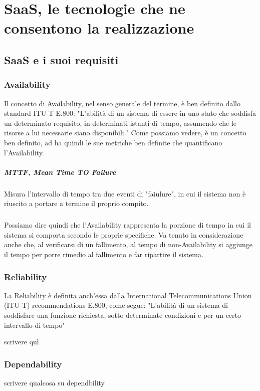 \chapter{SaaS, le tecnologie che ne consentono la realizzazione}

\section{SaaS e i suoi requisiti}

\subsection{Availability}
Il concetto di Availability, nel senso generale del termine, è ben definito dallo standard ITU-T E.800: "L'abilità di un sistema di essere in uno stato che soddisfa un determinato requisito, in determinati istanti di tempo, assumendo che le risorse a lui necessarie siano disponibili." Come possiamo vedere, è un concetto ben definito, ad ha quindi le sue metriche ben definite che quantificano l'Availability. 

\paragraph{MTTF, Mean Time TO Failure}
Misura l'intervallo di tempo tra due eventi di "faiulure", in cui il sistema non è riuscito a portare a termine il proprio compito.

\paragraph{}
Possiamo dire quindi che l'Availability rappresenta la porzione di tempo in cui il sistema si comporta secondo le proprie specifiche. Va tenuto in considerazione anche che, al verificarsi di un fallimento, al tempo di non-Availability si aggiunge il tempo per porre rimedio al fallimento e far ripartire il sistema. 

\subsection{Reliability}
La Reliability è definita anch'essa dalla International Telecommunications Union (ITU-T) recommendations E.800, come segue: "L'abilità di un sistema di soddisfare una funzione richiesta, sotto determinate condizioni e per un certo intervallo di tempo"

scrivere quì

\subsection{Dependability}
scrivere qualcosa su dependbility

